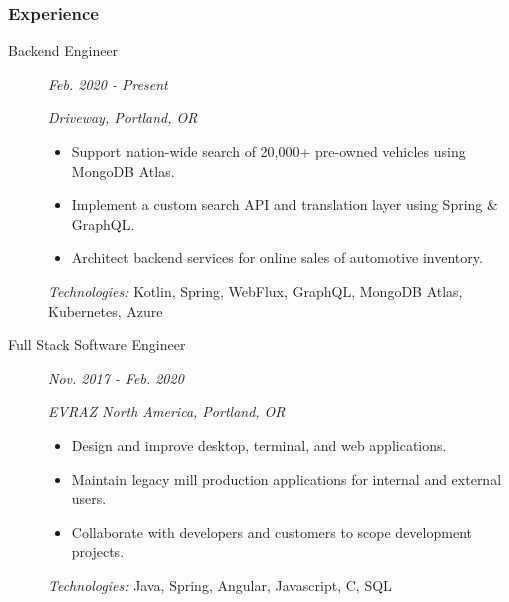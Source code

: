 \documentclass{article}
\begin{document}

\subsubsection*{Experience}

    \begin{description}
		
	\item[Backend Engineer] \hfill \textit{Feb. 2020 - Present}
		
        \textit{Driveway, Portland, OR}
        \begin{itemize}
        \item Support nation-wide search of 20,000+ pre-owned vehicles using MongoDB Atlas.
        \item Implement a custom search API and translation layer using Spring \& GraphQL.
        \item Architect backend services for online sales of automotive inventory.
          
        \end{itemize}
        \textit{Technologies:} Kotlin, Spring, WebFlux, GraphQL, MongoDB Atlas, Kubernetes, Azure
		\vspace{0.5em}

	\item[Full Stack Software Engineer] \hfill \textit{Nov. 2017 - Feb. 2020}
		
        \textit{EVRAZ North America, Portland, OR}
        \begin{itemize}     
            \item Design and improve desktop, terminal, and web applications.
            \item Maintain legacy mill production applications for internal and external users.
            \item Collaborate with developers and customers to scope development projects.
        \end{itemize}
        \textit{Technologies:} Java, Spring, Angular, Javascript, C, SQL
        
    \end{description}

\end{document}
